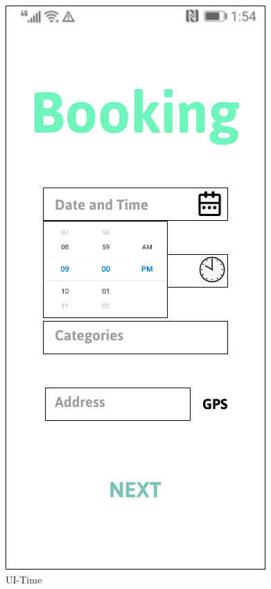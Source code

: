 \documentclass[a4paper,12pt]{report}
\begin{document}
\begin{figure}[H]
\begin{minipage}[t]{0.56\linewidth}
		\includegraphics[scale=0.5]{UI-Time.png}
		\caption{UI-Time}
		\label{fig:UI-Time}
	\end{minipage}
\end{figure}
\end{document}
